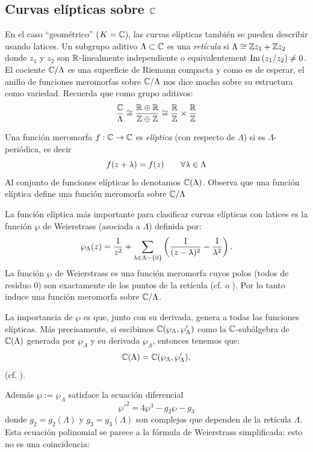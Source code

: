 \documentclass[../../tesis_maestria]{subfiles}
\begin{document}
\subsection{Curvas el\'ipticas sobre $\mathbb{C}$}

En el caso ``geom\'etrico'' ($K=\mathbb{C}$), las curvas el\'ipticas tambi\'en se pueden describir usando
latices. Un subgrupo aditivo $\Lambda\subset\mathbb{C}$ es una \emph{ret\'icula} si
$\Lambda\cong\mathbb{Z} z_1+\mathbb{Z} z_2$ donde $z_1$ y $z_2$ son $\mathbb{R}$-linealmente independiente o
equivalentement $\mathrm{Im}\left( z_1/z_2 \right)\neq 0$. El cociente $\mathbb{C}/\Lambda$ es una superficie de Riemann
compacta y como es de esperar, el anillo de funciones meromorfas sobre $\mathbb{C}/\Lambda$ nos dice
mucho sobre su estructura como variedad. Recuerda que como grupo aditivos:
\[
  \frac{\mathbb{C}}{\Lambda}\cong\frac{\mathbb{R}\oplus\mathbb{R}}{\mathbb{Z}\oplus\mathbb{Z}}\cong\frac{\mathbb{R}}{\mathbb{Z}}\times\frac{\mathbb{R}}{\mathbb{Z}}
\]


\begin{defin}
  Una funci\'on meromorfa $f:\mathbb{C}\rightarrow\mathbb{C}$ es \emph{el\'iptica} (con respecto de $\Lambda$) si es
  $\Lambda$-peri\'odica, es decir
  \[
    f(z+\lambda)=f(z) \qquad\forall \lambda\in\Lambda
  \]
  Al conjunto de funciones el\'ipticas lo denotamos $\mathbb{C}(\Lambda)$. Observa que una funci\'on
  el\'iptica define una funci\'on meromorfa sobre $\mathbb{C}/\Lambda$
\end{defin}

La funci\'on el\'iptica m\'as importante para clasificar curvas el\'ipticas con latices es la
funci\'on $\wp$ de Weierstrass (asociada a $\Lambda$) definida por:
\[
  \wp_{\Lambda}(z)=\frac{1}{z^2}+
  \sum_{\lambda\in\Lambda-\{0\}}\left( \frac{1}{(z-\lambda)^2}-\frac{1}{\lambda^2} \right).
\]
La funci\'on $\wp$ de Weierstrass es una funci\'on meromorfa cuyos polos (todos de residuo 0)
son exactamente de los puntos de la ret\'icula (cf. \cite[\S1.6, teorema 1.10]{ApostolMFADSINT} o
\cite[cap\'itulo 7, \S 3]{AhlforsCA}).  Por lo tanto induce una funci\'on meromorfa sobre
$\mathbb{C}/\Lambda$.

La importancia de $\wp$ es que, junto con su derivada, genera a todas las funciones el\'ipticas.
M\'as precisamente, si escibimos $\mathbb{C}(\wp_{\Lambda},\wp'_{\Lambda})$ como la $\mathbb{C}$-sub\'algebra de
$\mathbb{C}(\Lambda)$ generada por $\wp_{\Lambda}$ y su derivada $\wp_{\Lambda}$, entonces tenemos que:
\[
  \mathbb{C}(\Lambda) = \mathbb{C}(\wp_{\Lambda},\wp'_{\Lambda}),
\]
(cf. \cite[cap\'itlo VI, teorema 3.2]{SilvermanTAOEC}).

Adem\'as $\wp:=\wp_{\Lambda}$ satisface la ecuaci\'on diferencial
\[
  \wp'^2=4\wp^3-g_2\wp-g_3
\]
donde $g_2=g_2(\Lambda)$ y $g_3=g_3(\Lambda)$ son complejos que dependen de la ret\'icula $\Lambda$.
Esta ecuaci\'on polinomial se parece a la f\'ormula de Weierstrass simplificada; esto no es una
coincidencia:
\end{document}
